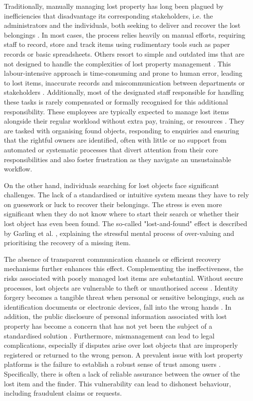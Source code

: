Traditionally, manually managing lost property has long been plagued by inefficiencies that disadvantage its corresponding stakeholders, i.e. the administrators and the individuals, both seeking to deliver and recover the lost belongings \cite{Sinha2024}. In most cases, the process relies heavily on manual efforts, requiring staff to record, store and track items using rudimentary tools such as paper records or basic spreadsheets. Others resort to simple and outdated \ac{ims} that are not designed to handle the complexities of lost property management \cite{Guinard2008}. This labour-intensive approach is time-consuming and prone to human error, leading to lost items, inaccurate records and miscommunication between departments or stakeholders \cite{Sinha2024, Guinard2008}. Additionally, most of the designated staff responsible for handling these tasks is rarely compensated or formally recognised for this additional responsibility. These employees are typically expected to manage lost items alongside their regular workload without extra pay, training, or resources \cite{Guinard2008}. They are tasked with organising found objects, responding to enquiries and ensuring that the rightful owners are identified, often with little or no support from automated or systematic processes that divert attention from their core responsibilities and also foster frustration as they navigate an unsustainable workflow.

On the other hand, individuals searching for lost objects face significant challenges. The lack of a standardised or intuitive system means they have to rely on guesswork or luck to recover their belongings. The stress is even more significant when they do not know where to start their search or whether their lost object has even been found. The so-called "lost-and-found" effect is described by Garling et al. \cite{Garling2023}, explaining the stressful mental process of over-valuing and prioritising the recovery of a missing item.

The absence of transparent communication channels \cite{Guinard2008} or efficient recovery mechanisms further enhances this effect. Complementing the ineffectiveness, the risks associated with poorly managed lost items are substantial. Without secure processes, lost objects are vulnerable to theft or unauthorised access \cite{Tan2023}. Identity forgery becomes a tangible threat when personal or sensitive belongings, such as identification documents or electronic devices, fall into the wrong hands \cite{Xue2022}. In addition, the public disclosure of personal information associated with lost property has become a concern that has not yet been the subject of a standardised solution \cite{Xue2022}. Furthermore, mismanagement can lead to legal complications, especially if disputes arise over lost objects that are improperly registered or returned to the wrong person. A prevalent issue with lost property platforms is the failure to establish a robust sense of trust among users \cite{Xue2022}. Specifically, there is often a lack of reliable assurance between the owner of the lost item and the finder. This vulnerability can lead to dishonest behaviour, including fraudulent claims or requests.

